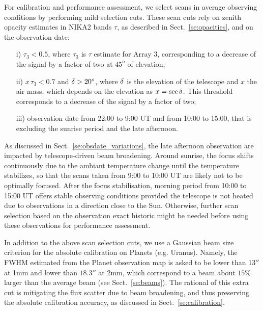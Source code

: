 For calibration and performance assessment, we select scans in average
observing conditions by performing mild selection cuts. These scan
cuts rely on zenith opacity estimates in NIKA2 bands $\tau$, as
described in Sect.~\ref{se:opacities}, and on the observation date:
%
\begin{itemize}
\item[i)] $\tau_{3} < 0.5$, where $\tau_{3}$ is $\tau$ estimate for
  Array 3, corresponding to a decrease of the signal by a factor of
  two at $45^{o}$ of elevation;
\item[ii)] $x\, \tau_{3} < 0.7$ and $\delta > 20^{o}$, where $\delta$ is the
  elevation of the telescope and $x$ the
  air mass, which depends on the elevation as $x=\sec \delta$. This
  threshold corresponds to a decrease of the signal by a factor of two;
\item[iii)] observation date from 22:00 to 9:00 UT and from 10:00 to
  15:00, that is excluding the sunrise period and the late afternoon.
\end{itemize}
%
As discussed in Sect.~\ref{se:obsdate_variations}, the late afternoon
observation are impacted by telescope-driven beam broadening. Around
sunrise, the focus shifts continuously due to the ambiant temperature
change until the temperature stabilizes, so that the scans taken from
9:00 to 10:00 UT are likely not to be optimally focused.
After the focus stabilisation, morning period 
from 10:00 to 15:00 UT offers stable observing conditions
provided the telescope is not heated due to observations in a
direction close to the Sun.  Otherwise, further scan selection based on the
observation exact historic might be needed before using these
observations for performance assessment.

   
In addition to the above scan selection cuts, we use a Gaussian beam
size criterion for the absolute calibration on Planets
(e.g. Uranus). Namely, the FWHM estimated from the Planet observation
map is asked to be lower than $13''$ at 1mm and lower than $18.3''$ at
2mm, which correspond to a beam about $15\%$ larger than the average
beam (see Sect.~\ref{se:beams}). The rational of this extra cut is
mitigating the flux scatter due to beam broadening, and thus
preserving the absolute calibration accuracy, as discussed in
Sect.~\ref{se:calibration}.




